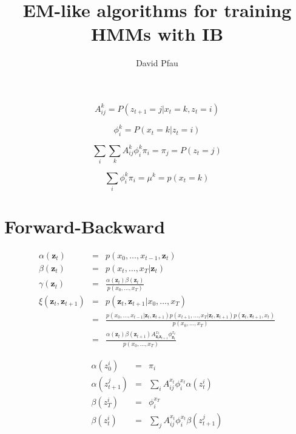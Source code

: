 \documentclass[11pt]{article}
\title{EM-like algorithms for training HMMs with IB}
\author{David Pfau}
\begin{document}
\maketitle

\[
A^{k}_{ij} = P(z_{t+1} = j | x_t = k, z_t = i)
\]

\[
\phi^k_i = P(x_t = k | z_t = i)
\]

\[
\sum_i \sum_k A^k_{ij} \phi^k_i \pi_i = \pi_j = P(z_t = j)
\]

\[
\sum_i \phi^k_i \pi_i = \mu^k = p(x_t = k)
\]

\section{Forward-Backward}

\begin{eqnarray*}
\alpha(\mathbf{z}_t) & = & p(x_0,\ldots,x_{t-1},\mathbf{z}_t) \\
\beta(\mathbf{z}_t) & = & p(x_t,\ldots,x_T|\mathbf{z}_t) \\
\gamma(\mathbf{z}_t) & = & \frac{\alpha(\mathbf{z}_t)\beta(\mathbf{z}_t)}{p(x_0,\ldots,x_T)} \\
\xi(\mathbf{z}_t,\mathbf{z}_{t+1}) & = & p(\mathbf{z}_t,\mathbf{z}_{t+1}|x_0,\ldots,x_T) \\
& = & \frac{p(x_0,\ldots,x_{t-1}|\mathbf{z}_{t},\mathbf{z}_{t+1})p(x_{t+1},\ldots,x_T|\mathbf{z}_{t},\mathbf{z}_{t+1})p(\mathbf{z}_t,\mathbf{z}_{t+1},x_t)}{p(x_0,\ldots,x_T)} \\
& = & \frac{\alpha(\mathbf{z}_t)\beta(\mathbf{z}_{t+1})A^{x_t}_{\mathbf{z}_t\mathbf{z}_{t+1}}\phi^{x_t}_{\mathbf{z}_t}}{p(x_0,\ldots,x_T)}
\end{eqnarray*}

\begin{eqnarray*}
\alpha(z_0^i) & = & \pi_i \\
\alpha(z_{t+1}^j) & = & \sum_i A^{x_t}_{ij}\phi^{x_t}_i\alpha(z_t^i) \\
\beta(z_T^i) & = & \phi^{x_T}_i \\
\beta(z_t^i) & = & \sum_j A^{x_t}_{ij}\phi^{x_t}_i \beta(z_{t+1}^j)
\end{eqnarray*}
\end{document}
